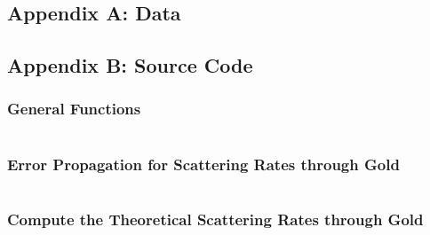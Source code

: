 \documentclass[a4paper]{article}
\begin{document}
\subsection{Appendix A: Data}

\subsection{Appendix B: Source Code}

\subsubsection{General Functions}
\label{cod:genFuncs}
\inputminted{julia}{Code/genFuncs.jl}

\subsubsection{Error Propagation for Scattering Rates through Gold}
\label{cod:uncertScatRateGold}
\inputminted{julia}{Code/getUncertScatRate.jl}

\subsubsection{Compute the Theoretical Scattering Rates through Gold}
\label{cod:theoScatRateGold}
\inputminted{julia}{Code/getTheoScatRatesGold.jl} 
\end{document}

